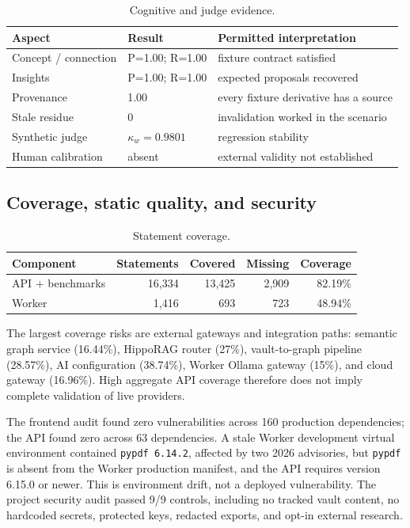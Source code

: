 \documentclass{sbc2023}
\newcommand{\code}[1]{\texttt{#1}}
\begin{document}
\begin{table}[!htbp]
\caption{Cognitive and judge evidence.}
\label{tab:cognitive}
\centering
\scriptsize
\begin{tabularx}{\columnwidth}{p{1.55cm}p{1.55cm}Y}
\toprule
Aspect & Result & Permitted interpretation \\
\midrule
Concept / connection & P=1.00; R=1.00 & fixture contract satisfied \\
Insights & P=1.00; R=1.00 & expected proposals recovered \\
Provenance & 1.00 & every fixture derivative has a source \\
Stale residue & 0 & invalidation worked in the scenario \\
Synthetic judge & $\kappa_w=0.9801$ & regression stability \\
Human calibration & absent & external validity not established \\
\bottomrule
\end{tabularx}
\end{table}

\subsection{Coverage, static quality, and security}

\begin{table}[!htbp]
\caption{Statement coverage.}
\label{tab:coverage}
\centering
\scriptsize
\setlength{\tabcolsep}{3pt}
\begin{tabularx}{\columnwidth}{Yrrrr}
\toprule
Component & Statements & Covered & Missing & Coverage \\
\midrule
API + benchmarks & 16,334 & 13,425 & 2,909 & 82.19\% \\
Worker & 1,416 & 693 & 723 & 48.94\% \\
\bottomrule
\end{tabularx}
\end{table}

The largest coverage risks are external gateways and integration paths: semantic graph service
(16.44\%), HippoRAG router (27\%), vault-to-graph pipeline (28.57\%), AI configuration (38.74\%),
Worker Ollama gateway (15\%), and cloud gateway (16.96\%). High aggregate API coverage therefore
does not imply complete validation of live providers.

The frontend audit found zero vulnerabilities across 160 production dependencies; the API found
zero across 63 dependencies. A stale Worker development virtual environment contained
\code{pypdf 6.14.2}, affected by two 2026 advisories, but \code{pypdf} is absent from the Worker
production manifest, and the API requires version 6.15.0 or newer. This is environment drift, not
a deployed vulnerability. The project security audit passed 9/9 controls, including no tracked
vault content, no hardcoded secrets, protected keys, redacted exports, and opt-in external
research.
\end{document}
